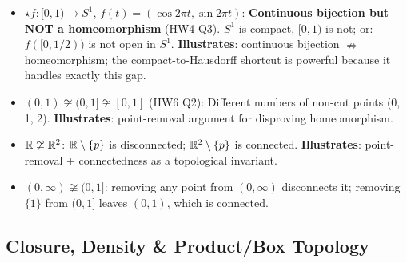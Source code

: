 \documentclass{article}
\newcommand{\starKey}{\textcolor{red!65!black}{\textbf{$\star$}}}
\begin{document}
\begin{itemize}
  \item \starKey $f:[0,1)\to S^1$, $f(t)=(\cos2\pi t,\sin2\pi t)$:
  \textbf{Continuous bijection but NOT a homeomorphism} (HW4 Q3).
  $S^1$ is compact, $[0,1)$ is not; or: $f([0,1/2))$ is not open in $S^1$.
  \textbf{Illustrates}: continuous bijection $\nRightarrow$ homeomorphism;
  the compact-to-Hausdorff shortcut is powerful because it handles exactly this gap.

  \item \textbf{$(0,1)\not\cong(0,1]\not\cong[0,1]$} (HW6 Q2):
  Different numbers of non-cut points (0, 1, 2).
  \textbf{Illustrates}: point-removal argument for disproving homeomorphism.

  \item \textbf{$\mathbb{R}\not\cong\mathbb{R}^2$}: $\mathbb{R}\setminus\{p\}$ is disconnected;
  $\mathbb{R}^2\setminus\{p\}$ is connected.
  \textbf{Illustrates}: point-removal + connectedness as a topological invariant.

  \item \textbf{$(0,\infty)\not\cong(0,1]$}: removing any point from $(0,\infty)$
  disconnects it; removing $\{1\}$ from $(0,1]$ leaves $(0,1)$, which is connected.
\end{itemize}

\subsection{Closure, Density \& Product/Box Topology}
\end{document}
